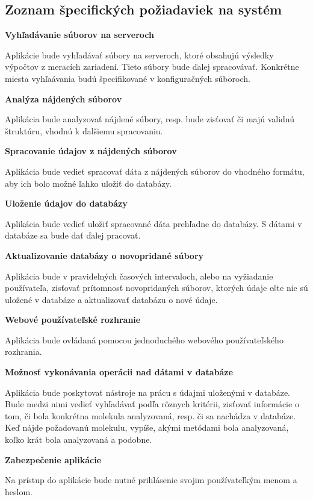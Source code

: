 \documentclass[12pt,a4paper]{article}
\begin{document}
\subsection{Zoznam špecifických požiadaviek na systém}
\begin{enumerate}[label={[\arabic*]}]
	\item{\bf Vyhľadávanie súborov na serveroch} \par 
	Aplikácie bude vyhľadávať súbory na serveroch, ktoré obsahujú výsledky výpočtov z meracích zariadení. Tieto súbory bude ďalej spracovávať. Konkrétne miesta vyhľaávania budú špecifikované v konfiguračných súboroch.
	\item{\bf Analýza nájdených súborov} \par
	Aplikácia bude analyzovať nájdené súbory, resp. bude zisťovať či majú validnú štruktúru, vhodnú k ďalšiemu spracovaniu.
	\item{\bf Spracovanie údajov z nájdených súborov} \par
	Aplikácia bude vedieť spracovať dáta z nájdených súborov do vhodného formátu, aby ich bolo možné ľahko uložiť do databázy. 
	\item{\bf Uloženie údajov do databázy} \par
	Aplikácia bude vedieť uložiť spracované dáta prehľadne do databázy. S dátami v databáze sa bude dať ďalej pracovať.
	\item{\bf Aktualizovanie databázy o novopridané súbory} \par
	Aplikácia bude v pravidelných časových intervaloch, alebo na vyžiadanie používateľa,  zisťovať prítomnosť novopridaných súborov, ktorých údaje ešte nie sú uložené v databáze a aktualizovať databázu o nové údaje.
	\item{\bf  Webové používateľské rozhranie} \par
	Aplikácia bude ovládaná pomocou jednoduchého webového používateľského rozhrania.
	\item{\bf Možnosť vykonávania operácii nad dátami v databáze} \par
	Aplikácia bude poskytovať nástroje na prácu s údajmi uloženými v databáze. Bude medzi nimi vedieť vyhľadávať podľa rôznych kritérii, zisťovať informácie o tom, či bola konkrétna molekula analyzovaná, resp. či sa nachádza v databáze. Keď nájde požadovanú molekulu, vypíše, akými metódami bola analyzovaná, koľko krát bola analyzovaná a podobne.
	\item{\bf Zabezpečenie aplikácie} \par
	Na prístup do aplikácie bude nutné prihlásenie svojim používateľkým menom a heslom.
\end{enumerate}
\end{document}
